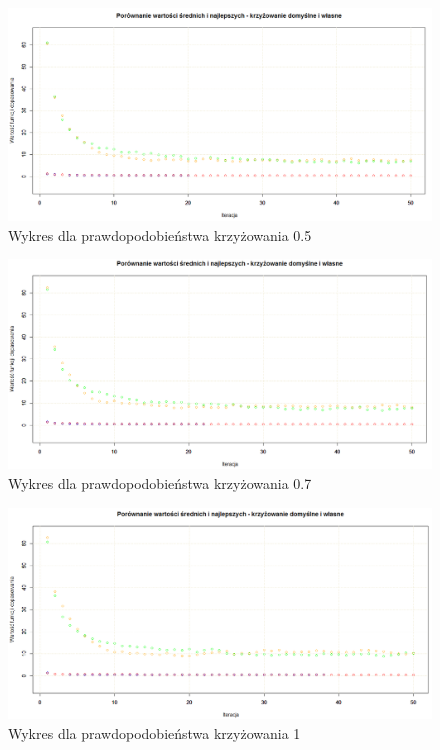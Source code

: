 \begin{figure}[H]
	\centering
	\hspace*{-0.8in}
	\includegraphics[scale = 0.5]{img/zad1/cross_0_5}
	\caption{Wykres dla prawdopodobieństwa krzyżowania 0.5}  
	\label{rys:cross_0_5} 
\end{figure}


\begin{figure}[H]
	\centering
	\hspace*{-0.8in}
	\includegraphics[scale = 0.5]{img/zad1/cross_0_7}
	\caption{Wykres dla prawdopodobieństwa krzyżowania 0.7}  
	\label{rys:cross_0_7} 
\end{figure}


\begin{figure}[H]
	\centering
	\hspace*{-0.8in}
	\includegraphics[scale = 0.5]{img/zad1/cross_1}
	\caption{Wykres dla prawdopodobieństwa krzyżowania 1}  
	\label{rys:cross_1} 
\end{figure}

